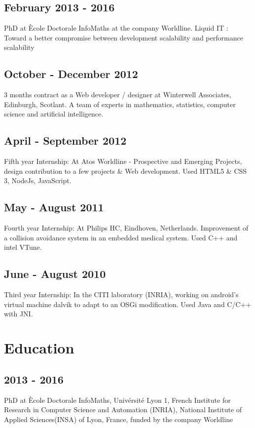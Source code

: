 	\subsection{February 2013 - 2016}
		{PhD at Ècole Doctorale InfoMaths at the company Worldline. Liquid IT : Toward a better compromise between development scalability and performance scalability}

	\subsection{October - December 2012}
		{3 months contract as a Web developer / designer at Winterwell Associates, Edinburgh, Scotlant. A team of experts in mathematics, statistics, computer science and artificial intelligence.}

	\subsection{April - September 2012}
		{Fifth year Internship: At Atos Worldline - Prospective and Emerging Projects, design contribution to a few projects \& Web development. Used HTML5 \& CSS 3, NodeJs, JavaScript.}

	\subsection{May - August 2011}
		{Fourth year Internship: At Philips HC, Eindhoven, Netherlands. Improvement of a collision avoidance system in an embedded medical system. Used C++ and intel VTune.}

	\subsection{June - August 2010}
		{Third year Internship: In the CITI laboratory (INRIA), working on android’s virtual machine dalvik to adapt to an OSGi modification. Used Java and C/C++ with JNI.}

\section{Education}
	\subsection{2013 - 2016}
		{PhD at Ècole Doctorale InfoMaths, Univérsité Lyon 1, French Institute for Research in Computer Science and Automation (INRIA), National Institute of Applied Sciences(INSA) of Lyon, France, funded by the company Worldline}

